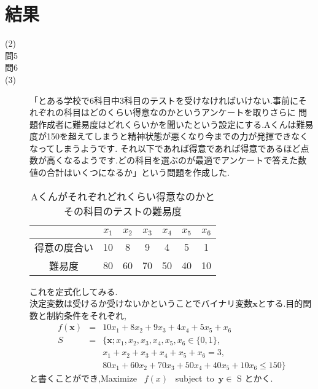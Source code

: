 \documentclass[12pt]{jarticle}
\begin{document}


\section{結果}
\begin{description}
    \item[(2)]
    \item[問5]
          
    \item[問6]
    \item[(3)]
          「とある学校で6科目中3科目のテストを受けなければいけない.事前にそれぞれの科目はどのくらい得意なのかというアンケートを取りさらに
          問題作成者に難易度はどれくらいかを聞いたという設定にする.Aくんは難易度が150を超えてしまうと精神状態が悪くなり今までの力が発揮できなくなってしまうようです.
          それ以下であれば得意であれば得意であるほど点数が高くなるようです.どの科目を選ぶのが最適でアンケートで答えた数値の合計はいくつになるか」という問題を作成した.
          \begin{table}[h]
              \caption{Aくんがそれぞれどれくらい得意なのかとその科目のテストの難易度}
              \begin{center}
                  \begin{tabular}{|c|c|c|c|c|c|c|}
                      \hline
                                   & $x_1$ & $x_2$ & $x_3$ & $x_4$ & $x_5$ & $x_6$ \\
                      \hline
                      得意の度合い & 10    & 8     & 9     & 4     & 5     & 1     \\
                      \hline
                      難易度       & 80    & 60    & 70    & 50    & 40    & 10    \\
                      \hline
                  \end{tabular}
              \end{center}
          \end{table}
          これを定式化してみる.\\
          決定変数は受けるか受けないかということでバイナリ変数$\boldsymbol{x}$とする.目的関数と制約条件をそれぞれ,
          \begin{eqnarray}
              f(\boldsymbol{x})&=&10x_1+8x_2+9x_3+4x_4+5x_5+x_6\nonumber\\
              S&=&\{\boldsymbol{x};x_1,x_2,x_3,x_4,x_5,x_6\in \{0,1\},\nonumber\\
              &&x_1+x_2+x_3+x_4+x_5+x_6=3,\nonumber\\
              &&80x_1+60x_2+70x_3+50x_4+40x_5+10x_6\leq 150\}\nonumber
          \end{eqnarray}
          と書くことができ,Maximize \ $f(x)$ \ subject\ to\ $\boldsymbol{y}\in$ S とかく.       
\end{description}
\end{document}
